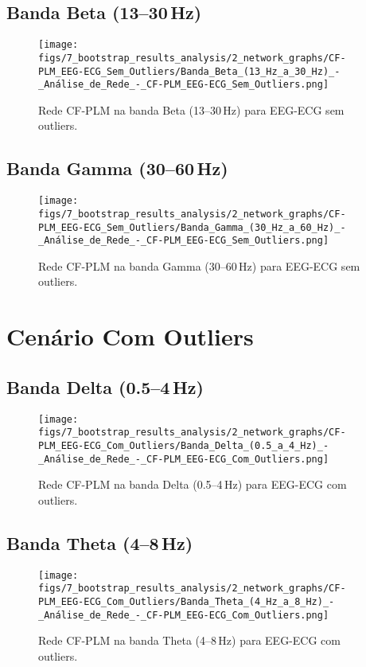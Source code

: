 \begin{apendicesenv}
    \subsection{Banda Beta (13--30\,Hz)}
    \begin{figure}[H]
      \centering
      \texttt{[image: figs/7\_bootstrap\_results\_analysis/2\_network\_graphs/CF-PLM\_EEG-ECG\_Sem\_Outliers/Banda\_Beta\_(13\_Hz\_a\_30\_Hz)\_-\_Análise\_de\_Rede\_-\_CF-PLM\_EEG-ECG\_Sem\_Outliers.png]}
      \caption{Rede CF-PLM na banda Beta (13--30\,Hz) para EEG-ECG sem outliers.}
      \label{fig:apend_cfplm_beta_sem}
    \end{figure}
    
    \subsection{Banda Gamma (30--60\,Hz)}
    \begin{figure}[H]
      \centering
      \texttt{[image: figs/7\_bootstrap\_results\_analysis/2\_network\_graphs/CF-PLM\_EEG-ECG\_Sem\_Outliers/Banda\_Gamma\_(30\_Hz\_a\_60\_Hz)\_-\_Análise\_de\_Rede\_-\_CF-PLM\_EEG-ECG\_Sem\_Outliers.png]}
      \caption{Rede CF-PLM na banda Gamma (30--60\,Hz) para EEG-ECG sem outliers.}
      \label{fig:apend_cfplm_gamma_sem}
    \end{figure}
    
    \section{Cenário Com Outliers}
    
    \subsection{Banda Delta (0.5--4\,Hz)}
    \begin{figure}[H]
      \centering
      \texttt{[image: figs/7\_bootstrap\_results\_analysis/2\_network\_graphs/CF-PLM\_EEG-ECG\_Com\_Outliers/Banda\_Delta\_(0.5\_a\_4\_Hz)\_-\_Análise\_de\_Rede\_-\_CF-PLM\_EEG-ECG\_Com\_Outliers.png]}
      \caption{Rede CF-PLM na banda Delta (0.5--4\,Hz) para EEG-ECG com outliers.}
      \label{fig:apend_cfplm_delta_com}
    \end{figure}
    
    \subsection{Banda Theta (4--8\,Hz)}
    \begin{figure}[H]
      \centering
      \texttt{[image: figs/7\_bootstrap\_results\_analysis/2\_network\_graphs/CF-PLM\_EEG-ECG\_Com\_Outliers/Banda\_Theta\_(4\_Hz\_a\_8\_Hz)\_-\_Análise\_de\_Rede\_-\_CF-PLM\_EEG-ECG\_Com\_Outliers.png]}
      \caption{Rede CF-PLM na banda Theta (4--8\,Hz) para EEG-ECG com outliers.}
      \label{fig:apend_cfplm_theta_com}
    \end{figure}
    

\end{apendicesenv}
